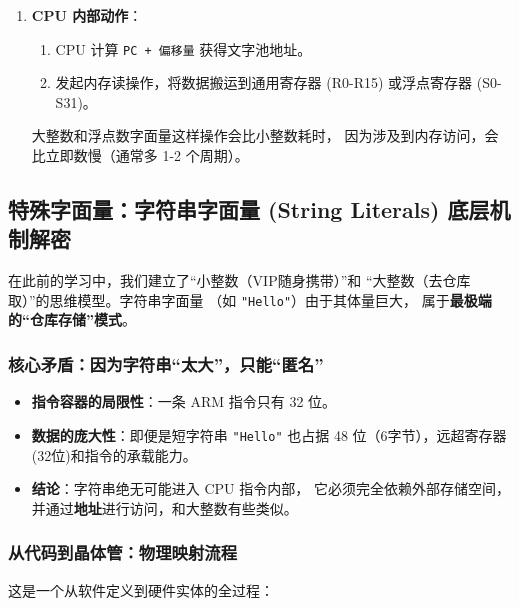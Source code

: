 \begin{enumerate}[label=(\arabic*), wide=0pt]
\begin{enumerate}[label=\ding{\numexpr171+\arabic*}]
    \item 硬件实体: 此时，数据物理上存在于 Flash 的某个存储单元中。CPU 执行到该行代码时，必须发起一次对 Flash 的\textbf{读操作}，将数据从文字池搬运到寄存器中。
\end{enumerate}




    \item \textbf{CPU 内部动作}：
    \begin{enumerate}[label=\ding{\numexpr171+\arabic*}]
        \item CPU 计算 \texttt{PC + 偏移量} 获得文字池地址。
        \item 发起内存读操作，将数据搬运到通用寄存器 (R0-R15) 或浮点寄存器 (S0-S31)。
    \end{enumerate}
    大整数和浮点数字面量这样操作会比小整数耗时，
    因为涉及到内存访问，会比立即数慢（通常多 1-2 个周期）。
\end{enumerate}


\subsection{特殊字面量：字符串字面量 (String Literals) 底层机制解密}

在此前的学习中，我们建立了“小整数（VIP随身携带）”和
“大整数（去仓库取）”的思维模型。字符串字面量
（如 \texttt{"Hello"}）由于其体量巨大，
属于\textbf{最极端的“仓库存储”模式}。


\subsubsection{ 核心矛盾：因为字符串“太大”，只能“匿名”}

\begin{itemize}
    \item \textbf{指令容器的局限性}：一条 ARM 指令只有 32 位。
    \item \textbf{数据的庞大性}：即便是短字符串 \texttt{"Hello"} 
    也占据 48 位（6字节），远超寄存器(32位)和指令的承载能力。
    \item \textbf{结论}：字符串绝无可能进入 CPU 指令内部，
    它必须完全依赖外部存储空间，并通过\textbf{地址}进行访问，和大整数有些类似。
\end{itemize}


\subsubsection{ 从代码到晶体管：物理映射流程}

这是一个从软件定义到硬件实体的全过程：

